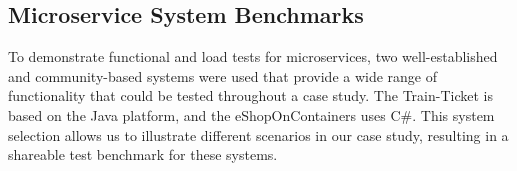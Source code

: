 




\subsection{Microservice System Benchmarks}
\label{subsec:benchmark}

To demonstrate functional and load tests for microservices, two well-established and community-based systems were used that provide a wide range of functionality that could be tested throughout a case study. The Train-Ticket \cite{trainticket} is based on the Java platform, and the eShopOnContainers \cite{eshop} uses C\#. This system selection allows us to illustrate different scenarios in our case study, resulting in a shareable test benchmark for these systems.

